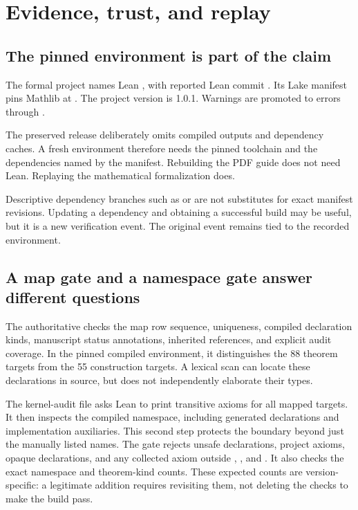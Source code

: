\clearpage
\section{Evidence, trust, and replay}
\subsection{The pinned environment is part of the claim}
The formal project names Lean , with reported Lean commit . Its Lake manifest pins Mathlib at . The project version is 1.0.1. Warnings are promoted to errors through .

The preserved release deliberately omits compiled outputs and dependency caches. A fresh environment therefore needs the pinned toolchain and the dependencies named by the manifest. Rebuilding the PDF guide does not need Lean. Replaying the mathematical formalization does.

Descriptive dependency branches such as  or  are not substitutes for exact manifest revisions. Updating a dependency and obtaining a successful build may be useful, but it is a new verification event. The original event remains tied to the recorded environment.

\subsection{A map gate and a namespace gate answer different questions}
The authoritative  checks the map row sequence, uniqueness, compiled declaration kinds, manuscript status annotations, inherited references, and explicit audit coverage. In the pinned compiled environment, it distinguishes the 88 theorem targets from the 55 construction targets. A lexical scan can locate these declarations in source, but does not independently elaborate their types.

The kernel-audit file asks Lean to print transitive axioms for all mapped targets. It then inspects the compiled  namespace, including generated declarations and implementation auxiliaries. This second step protects the boundary beyond just the manually listed names.
The gate rejects unsafe declarations, project axioms, opaque declarations, and any collected axiom outside , , and . It also checks the exact namespace and theorem-kind counts. These expected counts are version-specific: a legitimate addition requires revisiting them, not deleting the checks to make the build pass.


